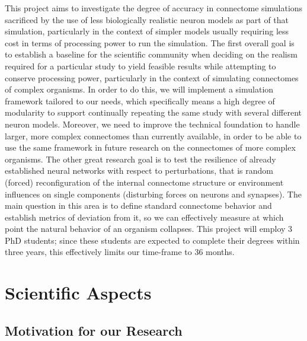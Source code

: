 \documentclass[a4paper,11pt]{article}
\begin{document}
This project aims to investigate the degree of accuracy in connectome simulations sacrificed by the use of less biologically realistic neuron models as part of that simulation, particularly in the context of simpler models usually requiring less cost in terms of processing power to run the simulation. The first overall goal is to establish a baseline for the scientific community when deciding on the realism required for a particular study to yield feasible results while attempting to conserve processing power, particularly in the context of simulating connectomes of complex organisms. In order to do this, we will implement a simulation framework tailored to our needs, which specifically means a high degree of modularity to support continually repeating the same study with several different neuron models. Moreover, we need to improve the technical foundation to handle larger, more complex connectomes than currently available, in order to be able to use the same framework in future research on the connectomes of more complex organisms. The other great research goal is to test the resilience of already established neural networks with respect to perturbations, that is random (forced) reconfiguration of the internal connectome structure or environment influences on single components (disturbing forces on neurons and synapses). The main question in this area is to define standard connectome behavior and establish metrics of deviation from it, so we can effectively measure at which point the natural behavior of an organism collapses. This project will employ 3 PhD students; since these students are expected to complete their degrees within three years, this effectively limits our time-frame to 36 months.


\newpage
%
%
\vspace{\baselineskip}
\vspace*{10mm}
\tableofcontents
\newpage
%
%
\section{Scientific Aspects}
\subsection{Motivation for our Research}
\end{document}
